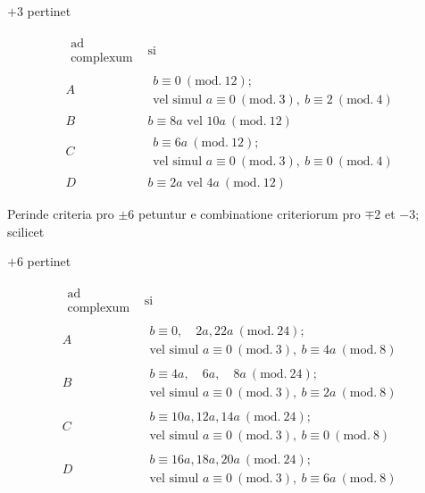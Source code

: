 %
\begin{center}$+3$ pertinet\end{center}
{\small
\[
\begin{array}{c|l}
\substack{\text{ad}\\\text{complexum}}&\text{si}\\
A&\begin{aligned}b\equiv0\ (\mathrm{mod.}\ 12);\\\text{vel simul }a\equiv0\ (\mathrm{mod.}\ 3),\ b\equiv2\ (\mathrm{mod.}\ 4)\end{aligned}\\
B&b\equiv8a\text{ vel }10a\ (\mathrm{mod.}\ 12)\\
C&\begin{aligned}b\equiv6a\ (\mathrm{mod.}\ 12);\\\text{vel simul }a\equiv0\ (\mathrm{mod.}\ 3),\ b\equiv0\ (\mathrm{mod.}\ 4)\end{aligned}\\
D&b\equiv2a\text{ vel }4a\ (\mathrm{mod.}\ 12)
\end{array}
\]
}

Perinde criteria pro $\pm6$ petuntur e combinatione criteriorum pro $\mp2$ et $-3$; scilicet
\begin{center}$+6$ pertinet\end{center}
{\small
\[
\begin{array}{c|l}
\substack{\text{ad}\\\text{complexum}}&\text{si}\\
A&\begin{aligned}b\equiv0,\quad2a,22a\ (\mathrm{mod.}\ 24);\\\text{vel simul }a\equiv0\ (\mathrm{mod.}\ 3),\ b\equiv4a\ (\mathrm{mod.}\ 8)\end{aligned}\\
B&\begin{aligned}b\equiv4a,\quad6a,\quad8a\ (\mathrm{mod.}\ 24);\\\text{vel simul }a\equiv0\ (\mathrm{mod.}\ 3),\ b\equiv2a\ (\mathrm{mod.}\ 8)\end{aligned}\\
C&\begin{aligned}b\equiv10a,12a,14a\ (\mathrm{mod.}\ 24);\\\text{vel simul }a\equiv0\ (\mathrm{mod.}\ 3),\ b\equiv0\ (\mathrm{mod.}\ 8)\end{aligned}\\
D&\begin{aligned}b\equiv16a,18a,20a\ (\mathrm{mod.}\ 24);\\\text{vel simul }a\equiv0\ (\mathrm{mod.}\ 3),\ b\equiv6a\ (\mathrm{mod.}\ 8)\end{aligned}
\end{array}
\]
}

